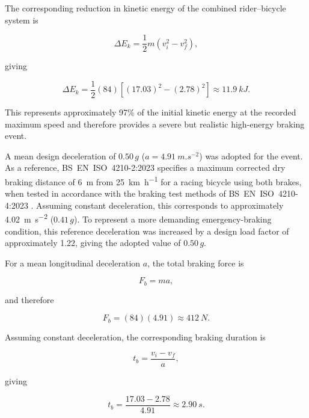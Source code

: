 \documentclass[11pt,a4paper]{article}
\begin{document}
The corresponding reduction in kinetic energy of the combined rider--bicycle
system is

\begin{equation}
    \Delta E_k
    =
    \frac{1}{2}m\left(v_i^2-v_f^2\right),
\end{equation}

giving

\begin{equation}
    \Delta E_k
    =
    \frac{1}{2}(84)
    \left[(17.03)^2-(2.78)^2\right]
    \approx
    \SI{11.9}{kJ}.
\end{equation}

This represents approximately 97\% of the initial kinetic energy at the
recorded maximum speed and therefore provides a severe but realistic
high-energy braking event.

A mean design deceleration of $0.50\,g$
($a=\SI{4.91}{m.s^{-2}}$) was adopted for the event. As a reference,
BS~EN~ISO~4210-2:2023 \cite{BSENISO4210-2-2023} specifies a maximum
corrected dry braking distance of \SI{6}{m} from
\SI{25}{km.h^{-1}} for a racing bicycle using both brakes, when tested in
accordance with the braking test methods of BS~EN~ISO~4210-4:2023
\cite{BSENISO4210-4-2023}. Assuming constant deceleration, this corresponds
to approximately \SI{4.02}{m.s^{-2}} ($0.41\,g$). To represent a more
demanding emergency-braking condition, this reference deceleration was
increased by a design load factor of approximately 1.22, giving the adopted
value of $0.50\,g$.

For a mean longitudinal deceleration $a$, the total braking force is

\begin{equation}
    F_b = ma,
\end{equation}

and therefore

\begin{equation}
    F_b
    =
    (84)(4.91)
    \approx
    \SI{412}{N}.
\end{equation}

Assuming constant deceleration, the corresponding braking duration is

\begin{equation}
    t_b
    =
    \frac{v_i-v_f}{a},
\end{equation}

giving

\begin{equation}
    t_b
    =
    \frac{17.03-2.78}{4.91}
    \approx
    \SI{2.90}{s}.
\end{equation}
\end{document}
